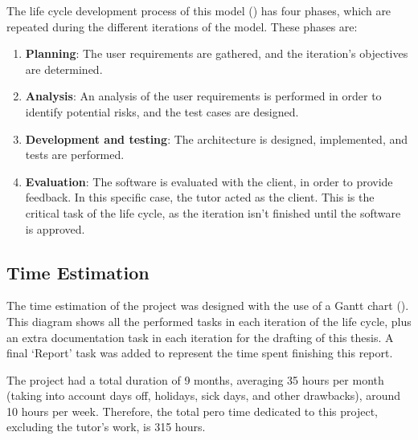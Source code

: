 The life cycle development process of this model () has four phases, which are repeated during the different iterations of the model. These phases are:
\begin{enumerate}
  \item \textbf{Planning}: The user requirements are gathered, and the iteration's objectives are determined.
  \item \textbf{Analysis}: An analysis of the user requirements is performed in order to identify potential risks, and the test cases are designed.
  \item \textbf{Development and testing}: The architecture is designed, implemented, and tests are performed.
  \item \textbf{Evaluation}: The software is evaluated with the client, in order to provide feedback. In this specific case, the tutor acted as the client. This is the critical task of the life cycle, as the iteration isn't finished until the software is approved.
\end{enumerate}



\subsection{Time Estimation}\label{subsec:time-estimation}
The time estimation of the project was designed with the use of a Gantt chart \parencite{clark1922gantt} (). This diagram shows all the performed tasks in each iteration of the life cycle, plus an extra documentation task in each iteration for the drafting of this thesis. A final `Report' task was added to represent the time spent finishing this report.

The project had a total duration of 9 months, averaging 35 hours per month (taking into account days off, holidays, sick days, and other drawbacks), around 10 hours per week. Therefore, the total pero time dedicated to this project, excluding the tutor's work, is 315 hours.


